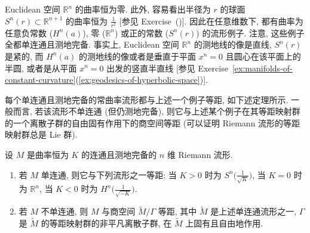 Euclidean 空间 $\mathbb{R}^n$ 的曲率恒为零. 此外, 容易看出半径为 $r$ 的球面 $S^n(r)\subset\mathbb{R}^{n+1}$ 的曲率恒为 $\frac1{r^2}$ [参见 Exercise~()]. 因此在任意维数下, 都有曲率为任意负常数 ($H^n(a)$), 零 ($\mathbb{R}^n$) 或正的常数 ($S^n(r)$) 的流形例子. 注意, 这些例子全都单连通且测地完备. 事实上, Euclidean 空间 $\mathbb{R}^n$ 的测地线的像是直线, $S^n(r)$ 是紧的, 而 $H^n(a)$ 的测地线的像或者是垂直于平面 $x^n=0$ 且圆心在该平面上的半圆, 或者是从平面 $x^n=0$ 出发的竖直半直线 [参见 Exercise~\ref{ex:manifolds-of-constant-curvature}(\ref{ex:geodesics-of-hyperbolic-space})].

每个单连通且测地完备的常曲率流形都与上述一个例子等距, 如下述定理所示. 一般而言, 若该流形不单连通 (但仍测地完备), 则它与上述某个例子在其等距映射群的一个离散子群的自由固有作用下的商空间等距 (可以证明 Riemann 流形的等距映射群总是 Lie 群).

\begin{RiemannTheorem}\label{thm:killing-hopf}
设 $M$ 是曲率恒为 $K$ 的连通且测地完备的 $n$ 维 Riemann 流形.
\begin{enumerate}[label=(\arabic*),leftmargin=*]
\item 若 $M$ 单连通, 则它与下列流形之一等距: 当 $K>0$ 时为 $S^n\bigl(\frac1{\sqrt K}\bigr)$, 当 $K=0$ 时为 $\mathbb{R}^n$, 当 $K<0$ 时为 $H^n\bigl(\frac1{\sqrt{-K}}\bigr)$.
\item 若 $M$ 不单连通, 则 $M$ 与商空间 $\widetilde M/\Gamma$ 等距, 其中 $\widetilde M$ 是上述单连通流形之一, $\Gamma$ 是 $\widetilde M$ 的等距映射群的非平凡离散子群, 在 $\widetilde M$ 上固有且自由地作用.
\end{enumerate}
\end{RiemannTheorem}

